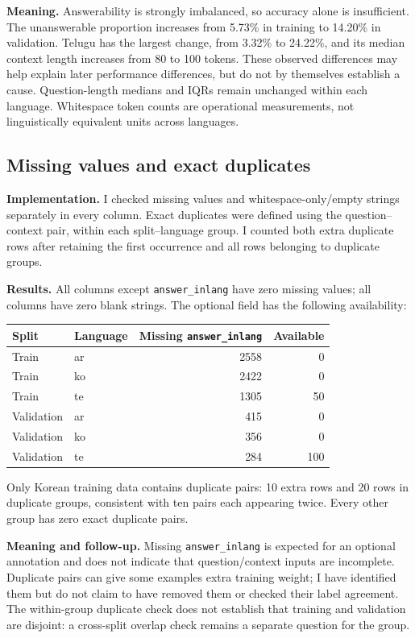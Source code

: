 \documentclass[11pt,a4paper]{article}
\begin{document}
\textbf{Meaning.} Answerability is strongly imbalanced, so accuracy alone is insufficient. The unanswerable proportion increases from 5.73\% in training to 14.20\% in validation. Telugu has the largest change, from 3.32\% to 24.22\%, and its median context length increases from 80 to 100 tokens. These observed differences may help explain later performance differences, but do not by themselves establish a cause. Question-length medians and IQRs remain unchanged within each language. Whitespace token counts are operational measurements, not linguistically equivalent units across languages.

\subsection{Missing values and exact duplicates}
\textbf{Implementation.} I checked missing values and whitespace-only/empty strings separately in every column. Exact duplicates were defined using the question--context pair, within each split--language group. I counted both extra duplicate rows after retaining the first occurrence and all rows belonging to duplicate groups.

\textbf{Results.} All columns except \texttt{answer\_inlang} have zero missing values; all columns have zero blank strings. The optional field has the following availability:

\begin{center}
\begin{tabular}{llrr}
\toprule
Split & Language & Missing \texttt{answer\_inlang} & Available \\
\midrule
Train & ar & 2558 & 0 \\
Train & ko & 2422 & 0 \\
Train & te & 1305 & 50 \\
Validation & ar & 415 & 0 \\
Validation & ko & 356 & 0 \\
Validation & te & 284 & 100 \\
\bottomrule
\end{tabular}
\end{center}

Only Korean training data contains duplicate pairs: 10 extra rows and 20 rows in duplicate groups, consistent with ten pairs each appearing twice. Every other group has zero exact duplicate pairs.

\textbf{Meaning and follow-up.} Missing \texttt{answer\_inlang} is expected for an optional annotation and does not indicate that question/context inputs are incomplete. Duplicate pairs can give some examples extra training weight; I have identified them but do not claim to have removed them or checked their label agreement. The within-group duplicate check does not establish that training and validation are disjoint: a cross-split overlap check remains a separate question for the group.
\end{document}

